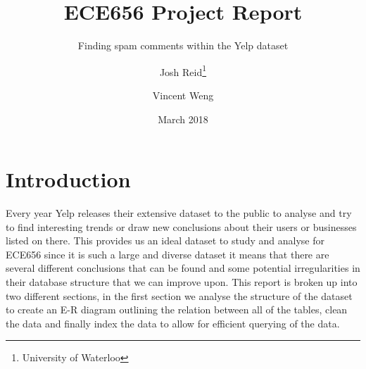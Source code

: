 \documentclass[12pt]{scrbook}
\title{ECE656 Project Report}
\subtitle{Finding spam comments within the Yelp dataset}
\date{March 2018}
\author{Josh Reid\thanks{University of Waterloo}
\and Vincent Weng\footnotemark[1]}
\begin{document}
\maketitle
\section{Introduction}
Every year Yelp releases their extensive dataset to the public to analyse and try to find interesting
trends or draw new conclusions about their users or businesses listed on there.
This provides us an ideal dataset to study and analyse for ECE656 since it is such a large and diverse
dataset it means that there are several different conclusions that can be found and some potential
irregularities in their database structure that we can improve upon.
This report is broken up into two different sections, in the first section we analyse the structure
of the dataset to create an E-R diagram outlining the relation between all of the tables, clean the data 
and finally index the data to allow for efficient querying of the data.
\end{document}
